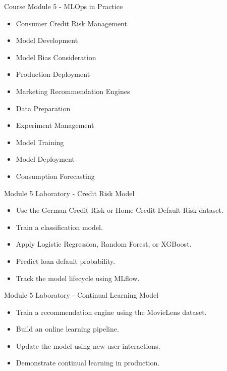 \documentclass[aspectratio=169]{beamer}
\begin{document}
\begin{frame}{Course Module 5 - MLOps in Practice}
\begin{itemize}

\item Consumer Credit Risk Management
\item Model Development
\item Model Bias Consideration
\item Production Deployment
\item Marketing Recommendation Engines
\item Data Preparation
\item Experiment Management
\item Model Training
\item Model Deployment
\item Consumption Forecasting

\end{itemize}
\end{frame}

\begin{frame}{Module 5 Laboratory - Credit Risk Model}

\begin{itemize}

\item Use the German Credit Risk or Home Credit Default Risk dataset.
\item Train a classification model.
\item Apply Logistic Regression, Random Forest, or XGBoost.
\item Predict loan default probability.
\item Track the model lifecycle using MLflow.

\end{itemize}

\end{frame}


\begin{frame}{Module 5 Laboratory - Continual Learning Model}

\begin{itemize}

\item Train a recommendation engine using the MovieLens dataset.
\item Build an online learning pipeline.
\item Update the model using new user interactions.
\item Demonstrate continual learning in production.

\end{itemize}

\end{frame}
\end{document}
